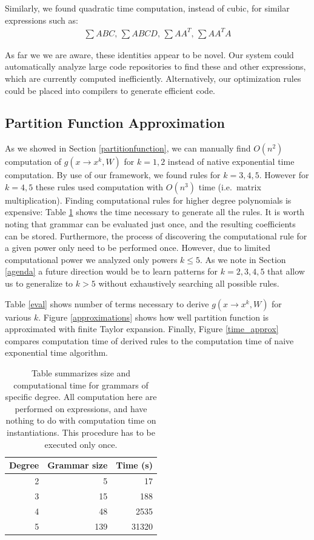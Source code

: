 Similarly, we found quadratic time computation, instead of cubic, for
similar expressions such as: 
\begin{align*}
	\sum ABC\text{, }\sum ABCD\text{, }\sum AA^T\text{, }\sum AA^TA
\end{align*}

As far we we are aware, these identities appear to be novel. Our
system could automatically analyze large code repositories to find
these and other expressions, which are currently computed
inefficiently. Alternatively, our optimization rules could be placed
into compilers to generate efficient code.

\subsection{Partition Function Approximation}

As we showed in Section \ref{partitionfunction}, we can manually find
$O(n^2)$ computation of $g(x \rightarrow x^k, W)$ for $k = 1, 2$
instead of native exponential time computation. By use of our
framework, we found rules for $k = 3, 4, 5$. However for $k = 4, 5$
these rules used computation with $O(n^3)$ time (i.e.~matrix
multiplication).  Finding computational rules for higher degree
polynomials is expensive: Table \ref{grammars} shows the time
necessary to generate all the rules. It is worth noting that grammar
can be evaluated just once, and the resulting coefficients can be
stored. Furthermore, the process of discovering the computational rule
for a given power only need to be performed once. However, due to limited computational
power we analyzed only powers $k \leq 5$. As we note in Section
\ref{agenda} a future direction would be to learn patterns for
$k=2,3,4,5$ that allow us to generalize to $k>5$ without exhaustively
searching all possible rules. 

Table \ref{eval} shows number of terms necessary to derive $g(x
\rightarrow x^k, W)$ for various $k$. Figure \ref{approximations} shows
how well partition function is approximated with finite Taylor
expansion. Finally, Figure \ref{time_approx} compares computation time
of derived rules to the computation time of naive exponential time
algorithm.

\begin{table}
\tiny
\centering
\begin{tabular}{rrr}
\hline
Degree & Grammar size & Time (s) \\
\hline
2 & 5 & 17 \\
3 & 15 & 188 \\
4 & 48 & 2535\\
5 & 139 & 31320 \\
\hline
\end{tabular}
\caption{Table summarizes size and computational time for grammars of specific degree. 
All computation here are performed on expressions, and have nothing to do with computation time on instantiations.
This procedure has to be executed only once.}
\label{grammars}
\end{table}

